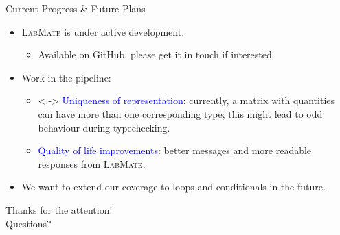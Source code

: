 \documentclass[]{beamer}
\newcommand{\keyword}[1]{\textcolor{blue}{#1}}
\newcommand{\lm}{\textsc{LabMate}\xspace}
\begin{document}
\begin{frame}{Current Progress \& Future Plans}
  \begin{itemize}[<+->]
  \item \lm is under active development.
    \smallskip
    \begin{itemize}[<.->]
    \item Available on GitHub, please get it in touch if interested.
    \end{itemize}
    \bigskip
  \item Work in the pipeline:
    \smallskip
    \begin{itemize}
    \item<.-> \keyword{Uniqueness of representation}: currently, a matrix with quantities can have more than one corresponding type; this might lead to odd behaviour during typechecking.
      \medskip
    \item \keyword{Quality of life improvements}: better messages and more readable responses from \lm.
      \medskip
      \end{itemize}
  \item We want to extend our coverage to loops and conditionals in the future.
  \end{itemize}
\end{frame}


\begin{frame}
  \begin{center}
    \LARGE Thanks for the attention!\\
    \pause
    \vspace{1em}
    \Huge Questions?
  \end{center}
\end{frame}
\end{document}
